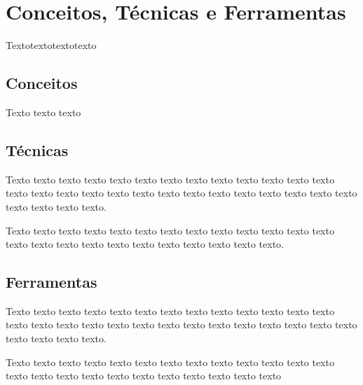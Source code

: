 



\chapter{Conceitos, Técnicas e Ferramentas}
\label{cap:conceitos_tecnicas_e_ferramentas}

Textotextotextotexto

\section{Conceitos}
\label{sec:conceitos}

    Texto texto texto

\section{Técnicas}
\label{sec:tecnicas}

    Texto texto texto texto texto texto texto texto texto texto texto texto
    texto texto texto texto texto texto texto texto texto texto texto texto
    texto texto texto texto texto texto texto.


    Texto texto texto texto texto texto texto texto texto texto texto texto
    texto texto texto texto texto texto texto texto texto texto texto texto.

\section{Ferramentas}
\label{sec:ferramentas}

    Texto texto texto texto texto texto texto texto texto texto texto texto
    texto texto texto texto texto texto texto texto texto texto texto texto
    texto texto texto texto texto texto texto.


    Texto texto texto texto texto texto texto texto texto texto texto texto
    texto texto texto texto texto texto texto texto texto texto texto texto

